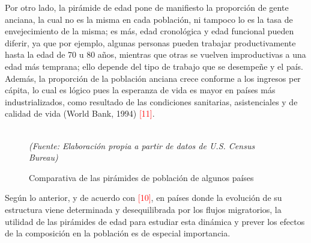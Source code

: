 Por otro lado, la pirámide de edad pone de manifiesto la proporción de gente anciana, la cual no es la misma en cada población, ni tampoco lo es la tasa de envejecimiento de la misma; es más, edad cronológica y edad funcional pueden diferir, ya que por ejemplo, algunas personas pueden trabajar productivamente hasta la edad de 70 u 80 años, mientras que otras se vuelven improductivas a una edad más temprana; ello depende del tipo de trabajo que se desempeñe y el país. Además, la proporción de la población anciana crece conforme a los ingresos per cápita, lo cual es lógico pues la esperanza de vida es mayor en países más industrializados, como resultado de las condiciones sanitarias, asistenciales y de calidad de vida (World Bank, 1994) \textcolor{red}{[11]}.
\begin{figure}[H]
\centering
\caption{Comparativa de las pir\'amides de poblaci\'on de algunos pa\'ises}\\
\textit{(Fuente: Elaboraci\'on propia a partir de datos de U.S. Census Bureau)}
\end{figure}

Seg\'un lo anterior, y de acuerdo con \textcolor{red}{[10]}, en pa\'ises donde la evoluci\'on de su estructura viene determinada y desequilibrada por los flujos migratorios, la utilidad de las pir\'amides de edad para estudiar esta din\'amica y prever los efectos de la composici\'on en la poblaci\'on es de especial importancia.

